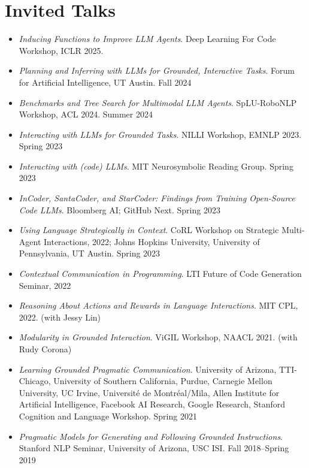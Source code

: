 


\section{Invited Talks}
\begin{itemize}[leftmargin=-0.4mm,partopsep=0pt,label=]
\item \emph{Inducing Functions to Improve LLM Agents}. Deep Learning For Code Workshop, ICLR 2025.
\item \emph{Planning and Inferring with LLMs for Grounded, Interactive Tasks}. Forum for Artificial Intelligence, UT Austin. Fall 2024
\item \emph{Benchmarks and Tree Search for Multimodal LLM Agents}. SpLU-RoboNLP Workshop, ACL 2024. Summer 2024
\item \emph{Interacting with LLMs for Grounded Tasks}. NILLI Workshop, EMNLP 2023. Spring 2023
\item \emph{Interacting with (code) LLMs}. MIT Neurosymbolic Reading Group. Spring 2023
\item \emph{InCoder, SantaCoder, and StarCoder: Findings from Training Open-Source Code LLMs}. Bloomberg AI; GitHub Next. Spring 2023
\item \emph{Using Language Strategically in Context}. CoRL Workshop on Strategic Multi-Agent Interactions, 2022; Johns Hopkins University, University of Pennsylvania, UT Austin. Spring 2023
\item \emph{Contextual Communication in Programming}. LTI Future of Code Generation Seminar, 2022
\item \emph{Reasoning About Actions and Rewards in Language Interactions}. MIT CPL, 2022. (with Jessy Lin)
\item \emph{Modularity in Grounded Interaction}. ViGIL Workshop, NAACL 2021. (with Rudy Corona)
\item \emph{Learning Grounded Pragmatic Communication}. University of Arizona, TTI-Chicago, University of Southern California, Purdue, Carnegie Mellon University, UC Irvine, Université de Montréal/Mila, Allen Institute for Artificial Intelligence, Facebook AI Research, Google Research, Stanford Cognition and Language Workshop. Spring 2021
\item \emph{Pragmatic Models for Generating and Following Grounded Instructions}. Stanford NLP Seminar, University of Arizona, USC ISI. Fall 2018--Spring 2019
\end{itemize}
